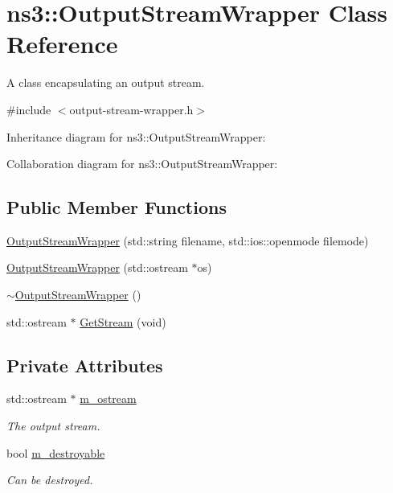 \hypertarget{classns3_1_1OutputStreamWrapper}{}\section{ns3\+:\+:Output\+Stream\+Wrapper Class Reference}
\label{classns3_1_1OutputStreamWrapper}


A class encapsulating an output stream.  




{\ttfamily \#include $<$output-\/stream-\/wrapper.\+h$>$}



Inheritance diagram for ns3\+:\+:Output\+Stream\+Wrapper\+:


Collaboration diagram for ns3\+:\+:Output\+Stream\+Wrapper\+:
\subsection*{Public Member Functions}
\begin{DoxyCompactItemize}
\item 
\hyperlink{classns3_1_1OutputStreamWrapper_a5cfd62599f52939b4cda27c8078bb142}{Output\+Stream\+Wrapper} (std\+::string filename, std\+::ios\+::openmode filemode)
\item 
\hyperlink{classns3_1_1OutputStreamWrapper_acbc77326b02ffdecfe22f6f3e13383f2}{Output\+Stream\+Wrapper} (std\+::ostream $\ast$os)
\item 
\hyperlink{classns3_1_1OutputStreamWrapper_a1cddf8cd86371273d1dee475c7aae1dc}{$\sim$\+Output\+Stream\+Wrapper} ()
\item 
std\+::ostream $\ast$ \hyperlink{classns3_1_1OutputStreamWrapper_a0cf30a4188ab6fdae2b2ab74db11acc2}{Get\+Stream} (void)
\end{DoxyCompactItemize}
\subsection*{Private Attributes}
\begin{DoxyCompactItemize}
\item 
std\+::ostream $\ast$ \hyperlink{classns3_1_1OutputStreamWrapper_ae89f82c0a92ac9f9a2edca6d28f6b528}{m\+\_\+ostream}
\begin{DoxyCompactList}\small\item\em The output stream. \end{DoxyCompactList}\item 
bool \hyperlink{classns3_1_1OutputStreamWrapper_aaaae2b2be1294f3ad89ab02e8913b5d0}{m\+\_\+destroyable}
\begin{DoxyCompactList}\small\item\em Can be destroyed. \end{DoxyCompactList}\end{DoxyCompactItemize}
